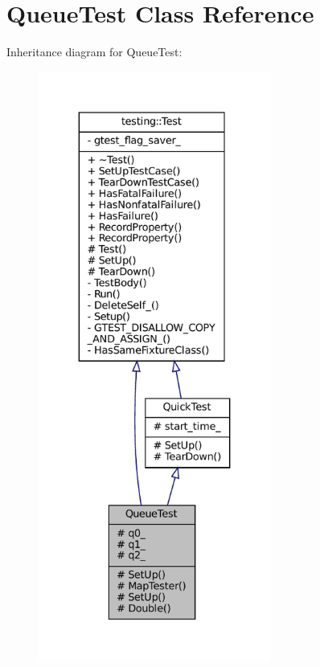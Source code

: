 \hypertarget{classQueueTest}{}\section{Queue\+Test Class Reference}
\label{classQueueTest}


Inheritance diagram for Queue\+Test\+:
\nopagebreak
\begin{figure}[H]
\begin{center}
\leavevmode
\includegraphics[height=550pt]{classQueueTest__inherit__graph}
\end{center}
\end{figure}


